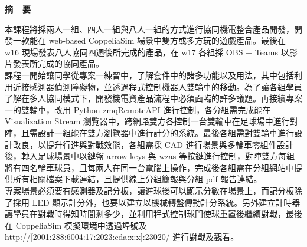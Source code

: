 \renewcommand{\baselinestretch}{1.5} %
\clearpage  %
\sectionef
{} %
\begin{center}
\LARGE\textbf{摘~~要}\\
\end{center}
\begin{flushleft}
\fontsize{14pt}{20pt}\sectionef\hspace{12pt}\quad 本課程將採兩人一組、四人一組與八人一組的方式進行協同機電整合產品開發，開發一款能在 web-based CoppeliaSim 場景中雙方或多方玩的遊戲產品。最後在 w16 現場發表八人協同四週後所完成的產品，在 w17 各組採 OBS + Teams 以影片發表所完成的協同產品。\\[12pt]

\fontsize{14pt}{20pt}\sectionef\hspace{12pt}\quad 課程一開始讓同學從專案一練習中，了解套件中的諸多功能以及用法，其中包括利用近接感測器偵測障礙物，並透過程式控制機器人雙輪車的移動。為了讓各組學員了解在多人協同模式下，開發機電資產品流程中必須面臨的許多議題。再接續專案一的雙輪車，改用 Python zmqRemoteAPI 進行控制，各分組需完成能在 Visualization Stream 瀏覽器中，跨網路雙方各控制一台雙輪車在足球場中進行對陣，且需設計一組能在雙方瀏覽器中進行計分的系統。最後各組需對雙輪車進行設計改良，以提升行進與對戰效能，各組需採 CAD 進行場景與多輪車零組件設計後，轉入足球場景中以鍵盤 arrow keys 與 wzas 等按鍵進行控制，對陣雙方每組將有四名輪車球員，且每兩人在同一台電腦上操作，完成後各組需在分組網站中提供所有相關檔案下載連結，且提供線上分組簡報與分組 pdf 報告連結。\\[12pt]

\fontsize{14pt}{20pt}\sectionef\hspace{12pt}\quad 專案場景必須要有感測器及記分板，讓進球後可以顯示分數在場景上，而記分板除了採用 LED 顯示計分外，也要以建立以機械轉盤傳動計分系統。另外建立計時器讓學員在對戰時得知時間剩多少，並利用程式控制球門使球重置後繼續對戰，最後在
CoppeliaSim 模擬環境中透過埠號及 http://[2001:288:6004:17:2023:cda:x:x]:23020/ 進行對戰及觀看。\\[12pt]
\end{flushleft}
\newpage
\renewcommand{\baselinestretch}{1.5} %
